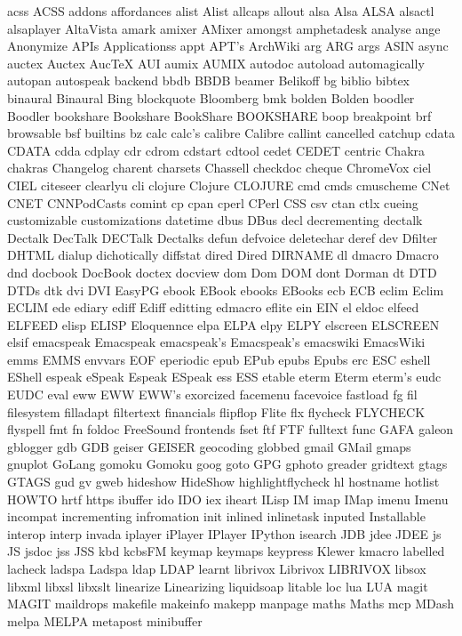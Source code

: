 acss
ACSS
addons
affordances
alist
Alist
allcaps
allout
alsa
Alsa
ALSA
alsactl
alsaplayer
AltaVista
amark
amixer
AMixer
amongst
amphetadesk
analyse
ange
Anonymize
APIs
Applicationss
appt
APT's
ArchWiki
arg
ARG
args
ASIN
async
auctex
Auctex
AucTeX
AUI
aumix
AUMIX
autodoc
autoload
automagically
autopan
autospeak
backend
bbdb
BBDB
beamer
Belikoff
bg
biblio
bibtex
binaural
Binaural
Bing
blockquote
Bloomberg
bmk
bolden
Bolden
boodler
Boodler
bookshare
Bookshare
BookShare
BOOKSHARE
boop
breakpoint
brf
browsable
bsf
builtins
bz
calc
calc's
calibre
Calibre
callint
cancelled
catchup
cdata
CDATA
cdda
cdplay
cdr
cdrom
cdstart
cdtool
cedet
CEDET
centric
Chakra
chakras
Changelog
charent
charsets
Chassell
checkdoc
cheque
ChromeVox
ciel
CIEL
citeseer
clearlyu
cli
clojure
Clojure
CLOJURE
cmd
cmds
cmuscheme
CNet
CNET
CNNPodCasts
comint
cp
cpan
cperl
CPerl
CSS
csv
ctan
ctlx
cueing
customizable
customizations
datetime
dbus
DBus
decl
decrementing
dectalk
Dectalk
DecTalk
DECTalk
Dectalks
defun
defvoice
deletechar
deref
dev
Dfilter
DHTML
dialup
dichotically
diffstat
dired
Dired
DIRNAME
dl
dmacro
Dmacro
dnd
docbook
DocBook
doctex
docview
dom
Dom
DOM
dont
Dorman
dt
DTD
DTDs
dtk
dvi
DVI
EasyPG
ebook
EBook
ebooks
EBooks
ecb
ECB
eclim
Eclim
ECLIM
ede
ediary
ediff
Ediff
editting
edmacro
eflite
ein
EIN
el
eldoc
elfeed
ELFEED
elisp
ELISP
Eloquennce
elpa
ELPA
elpy
ELPY
elscreen
ELSCREEN
elsif
emacspeak
Emacspeak
emacspeak's
Emacspeak's
emacswiki
EmacsWiki
emms
EMMS
envvars
EOF
eperiodic
epub
EPub
epubs
Epubs
erc
ESC
eshell
EShell
espeak
eSpeak
Espeak
ESpeak
ess
ESS
etable
eterm
Eterm
eterm's
eudc
EUDC
eval
eww
EWW
EWW's
exorcized
facemenu
facevoice
fastload
fg
fil
filesystem
filladapt
filtertext
financials
flipflop
Flite
flx
flycheck
FLYCHECK
flyspell
fmt
fn
foldoc
FreeSound
frontends
fset
ftf
FTF
fulltext
func
GAFA
galeon
gblogger
gdb
GDB
geiser
GEISER
geocoding
globbed
gmail
GMail
gmaps
gnuplot
GoLang
gomoku
Gomoku
goog
goto
GPG
gphoto
greader
gridtext
gtags
GTAGS
gud
gv
gweb
hideshow
HideShow
highlightflycheck
hl
hostname
hotlist
HOWTO
hrtf
https
ibuffer
ido
IDO
iex
iheart
ILisp
IM
imap
IMap
imenu
Imenu
incompat
incrementing
infromation
init
inlined
inlinetask
inputed
Installable
interop
interp
invada
iplayer
iPlayer
IPlayer
IPython
isearch
JDB
jdee
JDEE
js
JS
jsdoc
jss
JSS
kbd
kcbsFM
keymap
keymaps
keypress
Klewer
kmacro
labelled
lacheck
ladspa
Ladspa
ldap
LDAP
learnt
librivox
Librivox
LIBRIVOX
libsox
libxml
libxsl
libxslt
linearize
Linearizing
liquidsoap
litable
loc
lua
LUA
magit
MAGIT
maildrops
makefile
makeinfo
makepp
manpage
maths
Maths
mcp
MDash
melpa
MELPA
metapost
minibuffer
